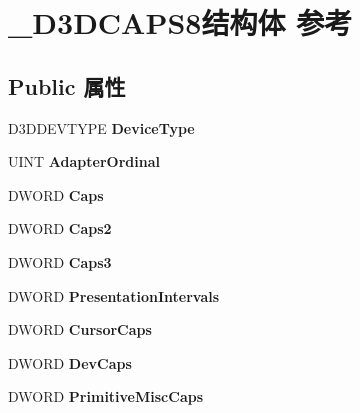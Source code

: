\hypertarget{struct___d3_d_c_a_p_s8}{}\section{\+\_\+\+D3\+D\+C\+A\+P\+S8结构体 参考}
\label{struct___d3_d_c_a_p_s8}
\subsection*{Public 属性}
\begin{DoxyCompactItemize}
\item 
\mbox{\label{struct___d3_d_c_a_p_s8_a5471e49b1ee8f285af885d22e5b785c3}} 
D3\+D\+D\+E\+V\+T\+Y\+PE {\bfseries Device\+Type}
\item 
\mbox{\label{struct___d3_d_c_a_p_s8_a0dcd23f954e861e94c4172e1ef047507}} 
U\+I\+NT {\bfseries Adapter\+Ordinal}
\item 
\mbox{\label{struct___d3_d_c_a_p_s8_a8e18f1a72286266c9942c4598b2f698a}} 
D\+W\+O\+RD {\bfseries Caps}
\item 
\mbox{\label{struct___d3_d_c_a_p_s8_a71e168e3af9f5da5f38fc219552def5f}} 
D\+W\+O\+RD {\bfseries Caps2}
\item 
\mbox{\label{struct___d3_d_c_a_p_s8_a6f08434edf43d5d88d9d74cf16f2f60a}} 
D\+W\+O\+RD {\bfseries Caps3}
\item 
\mbox{\label{struct___d3_d_c_a_p_s8_a01c2e63b3876e3ce84d004adf18ba960}} 
D\+W\+O\+RD {\bfseries Presentation\+Intervals}
\item 
\mbox{\label{struct___d3_d_c_a_p_s8_a0f0668e99d56594c7cbc774a4dc865d0}} 
D\+W\+O\+RD {\bfseries Cursor\+Caps}
\item 
\mbox{\label{struct___d3_d_c_a_p_s8_aa4280c420cbda20b7ee9641b0d85ca32}} 
D\+W\+O\+RD {\bfseries Dev\+Caps}
\item 
\mbox{\label{struct___d3_d_c_a_p_s8_abf5ae8785dd2d8da2b143960af2d521f}} 
D\+W\+O\+RD {\bfseries Primitive\+Misc\+Caps}

\end{DoxyCompactItemize}
